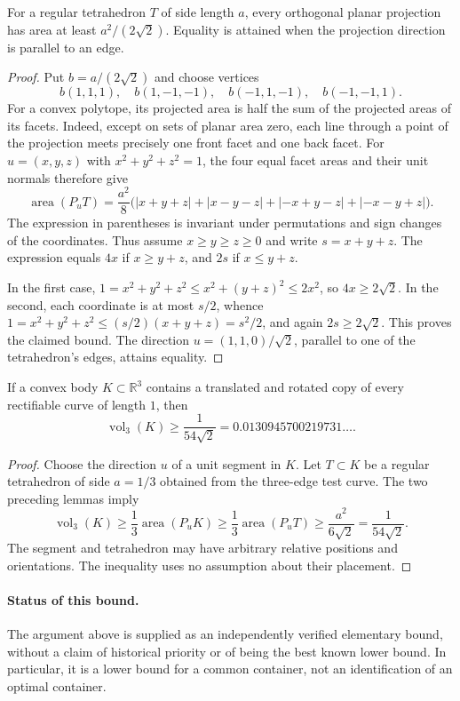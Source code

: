 \begin{lemma}
For a regular tetrahedron $T$ of side length $a$, every orthogonal planar
projection has area at least $a^2/(2\sqrt2)$.  Equality is attained when
the projection direction is parallel to an edge.
\end{lemma}
\begin{proof}
Put $b=a/(2\sqrt2)$ and choose vertices
\[
 b(1,1,1),\quad b(1,-1,-1),\quad
 b(-1,1,-1),\quad b(-1,-1,1).
\]
For a convex polytope, its projected area is half the sum of the projected
areas of its facets.  Indeed, except on sets of planar area zero, each
line through a point of the projection meets precisely one front facet
and one back facet.  For $u=(x,y,z)$ with $x^2+y^2+z^2=1$, the four
equal facet areas and their unit normals therefore give
\[
 \operatorname{area}(P_uT)=\frac{a^2}{8}\bigl(
 |x+y+z|+|x-y-z|+|-x+y-z|+|-x-y+z|\bigr).
\]
The expression in parentheses is invariant under permutations and sign
changes of the coordinates.  Thus assume $x\geq y\geq z\geq0$ and write
$s=x+y+z$.  The expression equals $4x$ if $x\geq y+z$, and $2s$
if $x\leq y+z$.

In the first case,
$1=x^2+y^2+z^2\leq x^2+(y+z)^2\leq2x^2$, so $4x\geq2\sqrt2$.
In the second, each coordinate is at most $s/2$, whence
$1=x^2+y^2+z^2\leq(s/2)(x+y+z)=s^2/2$, and again
$2s\geq2\sqrt2$.  This proves the claimed bound.  The direction
$u=(1,1,0)/\sqrt2$, parallel to one of the tetrahedron's edges,
attains equality.
\end{proof}

\begin{theorem}
If a convex body $K\subset\mathbb R^3$ contains a translated and rotated
copy of every rectifiable curve of length $1$, then
\[
 \operatorname{vol}_3(K)\geq\frac{1}{54\sqrt2}
 =0.0130945700219731\ldots.
\]
\end{theorem}
\begin{proof}
Choose the direction $u$ of a unit segment in $K$.  Let $T\subset K$
be a regular tetrahedron of side $a=1/3$ obtained from the three-edge
test curve.  The two preceding lemmas imply
\[
 \operatorname{vol}_3(K)\geq\frac13\operatorname{area}(P_uK)
 \geq\frac13\operatorname{area}(P_uT)
 \geq\frac{a^2}{6\sqrt2}=\frac{1}{54\sqrt2}.
\]
The segment and tetrahedron may have arbitrary relative positions and
orientations.  The inequality uses no assumption about their placement.
\end{proof}

\paragraph{Status of this bound.}
The argument above is supplied as an independently verified elementary
bound, without a claim of historical priority or of being the best known
lower bound.  In particular, it is a lower bound for a common container,
not an identification of an optimal container.
